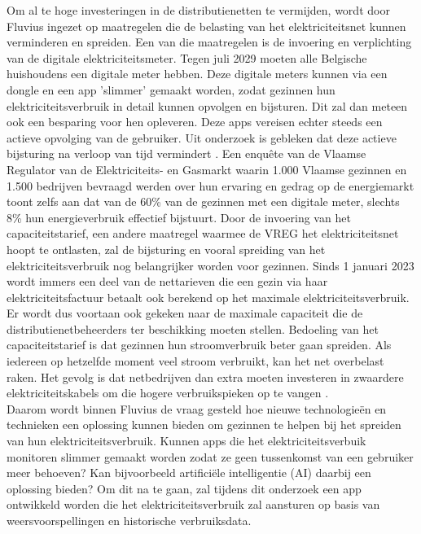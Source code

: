 Om al te hoge investeringen in de distributienetten te vermijden, wordt door Fluvius ingezet op maatregelen die de belasting van het elektriciteitsnet kunnen verminderen en spreiden. Een van die maatregelen is de invoering en verplichting van de digitale elektriciteitsmeter. Tegen juli 2029 moeten alle Belgische huishoudens een digitale meter hebben. Deze digitale meters kunnen via een dongle en een app 'slimmer' gemaakt worden, zodat gezinnen hun elektriciteitsverbruik in detail kunnen opvolgen en bijsturen. Dit zal dan meteen ook een besparing voor hen opleveren. Deze apps vereisen echter steeds een actieve opvolging van de gebruiker. Uit onderzoek is gebleken dat deze actieve bijsturing na verloop van tijd vermindert \autocite{Wemyss2019}. Een enquête van de Vlaamse Regulator van de Elektriciteits- en Gasmarkt \textcite{VREG2021} waarin 1.000 Vlaamse gezinnen en 1.500 bedrijven bevraagd werden over hun ervaring en gedrag op de energiemarkt toont zelfs aan dat van de 60\% van de gezinnen met een digitale meter, slechts 8\% hun energieverbruik effectief bijstuurt. Door de invoering van het capaciteitstarief, een andere maatregel waarmee de VREG het elektriciteitsnet hoopt te ontlasten, zal de bijsturing en vooral spreiding van het elektriciteitsverbruik nog belangrijker worden voor gezinnen. Sinds 1 januari 2023 wordt immers een deel van de nettarieven die een gezin via haar elektriciteitsfactuur betaalt ook berekend op het maximale elektriciteitsverbruik. Er wordt dus voortaan ook gekeken naar de maximale capaciteit die de distributienetbeheerders ter beschikking moeten stellen. Bedoeling van het capaciteitstarief is dat gezinnen hun stroomverbruik beter gaan spreiden. Als iedereen op hetzelfde moment veel stroom verbruikt, kan het net overbelast raken. Het gevolg is dat netbedrijven dan extra moeten investeren in zwaardere elektriciteitskabels om die hogere verbruikspieken op te vangen \autocite{Selleslagh2022}. \\

Daarom wordt binnen Fluvius de vraag gesteld hoe nieuwe technologieën en technieken een oplossing kunnen bieden om gezinnen te helpen bij het spreiden van hun elektriciteitsverbruik. Kunnen apps die het elektriciteitsverbuik monitoren slimmer gemaakt worden zodat ze geen tussenkomst van een gebruiker meer behoeven? Kan bijvoorbeeld artificiële intelligentie (AI) daarbij een oplossing bieden? Om dit na te gaan, zal tijdens dit onderzoek een app ontwikkeld worden die het elektriciteitsverbruik zal aansturen op basis van weersvoorspellingen en historische verbruiksdata.

